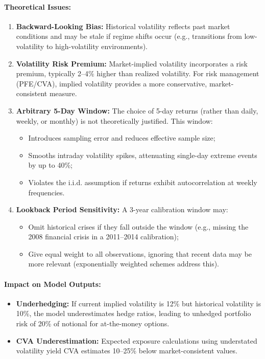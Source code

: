 \paragraph{Theoretical Issues:}
\begin{enumerate}
	\item \textbf{Backward-Looking Bias:} Historical volatility reflects past market conditions and may be stale if regime shifts occur (e.g., transitions from low-volatility to high-volatility environments).
	
	\item \textbf{Volatility Risk Premium:} Market-implied volatility incorporates a risk premium, typically 2--4\% higher than realized volatility. For risk management (PFE/CVA), implied volatility provides a more conservative, market-consistent measure.
	
	\item \textbf{Arbitrary 5-Day Window:} The choice of 5-day returns (rather than daily, weekly, or monthly) is not theoretically justified. This window:
	\begin{itemize}
		\item Introduces sampling error and reduces effective sample size;
		\item Smooths intraday volatility spikes, attenuating single-day extreme events by up to 40\%;
		\item Violates the i.i.d. assumption if returns exhibit autocorrelation at weekly frequencies.
	\end{itemize}
	
	\item \textbf{Lookback Period Sensitivity:} A 3-year calibration window may:
	\begin{itemize}
		\item Omit historical crises if they fall outside the window (e.g., missing the 2008 financial crisis in a 2011--2014 calibration);
		\item Give equal weight to all observations, ignoring that recent data may be more relevant (exponentially weighted schemes address this).
	\end{itemize}
\end{enumerate}

\paragraph{Impact on Model Outputs:}
\begin{itemize}
	\item \textbf{Underhedging:} If current implied volatility is 12\% but historical volatility is 10\%, the model underestimates hedge ratios, leading to unhedged portfolio risk of 20\% of notional for at-the-money options.
	\item \textbf{CVA Underestimation:} Expected exposure calculations using understated volatility yield CVA estimates 10--25\% below market-consistent values.
\end{itemize}

